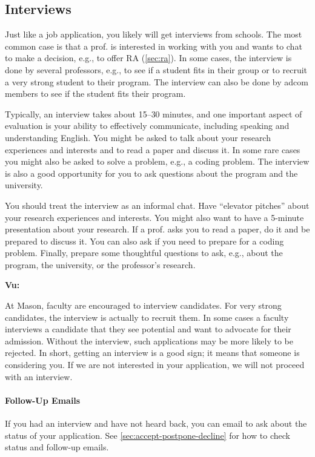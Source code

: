 \documentclass[oneside,11pt,dvipsnames]{book}
\newenvironment{commentbox}[1][]{
  \small
  \begin{mybox}
    {\small \textbf{#1}}
  }{
  \end{mybox}
}
\begin{document}
\subsection{Interviews} 

Just like a job application, you likely will get interviews from schools. The most common case is that a prof. is interested in working with you and wants to chat to make a decision, e.g., to offer RA (\autoref{sec:ra}). In some cases, the interview is done by several professors, e.g., to see if a student fits in their group or to recruit a very strong student to their program. The interview can also be done by adcom members to see if the student fits their program.

Typically, an interview takes about 15--30 minutes, and one important aspect of evaluation is your ability to effectively communicate, including speaking and understanding English. 
You might be asked to talk about your research experiences and interests and to read a paper and discuss it. In some rare cases you might also be asked to solve a problem, e.g., a coding problem. 
The interview is also a good opportunity for you to ask questions about the program and the university.

You should treat the interview as an informal chat. Have ``elevator pitches'' about your research experiences and interests. You might also want to have a 5-minute presentation about your research. If a prof. asks you to read a paper, do it and be prepared to discuss it. You can also ask if you need to prepare for a coding problem. Finally, prepare some thoughtful questions to ask, e.g., about the program, the university, or the professor's research.

\begin{commentbox}[Vu:]
  At Mason, faculty are encouraged to interview candidates. For very strong candidates, the interview is actually to recruit them.  In some cases a faculty interviews a candidate that they see potential and want to advocate for their admission. Without the interview, such applications may be more likely to be rejected.
  \tcblower
  In short, getting an interview is a good sign; it means that someone is considering you. If we are not interested in your application, we will not proceed with an interview.
\end{commentbox}

\paragraph{Follow-Up Emails} If you had an interview and have not heard back, you can email to ask about the status of your application. See \autoref{sec:accept-postpone-decline} for how to check status and follow-up emails.
\end{document}
